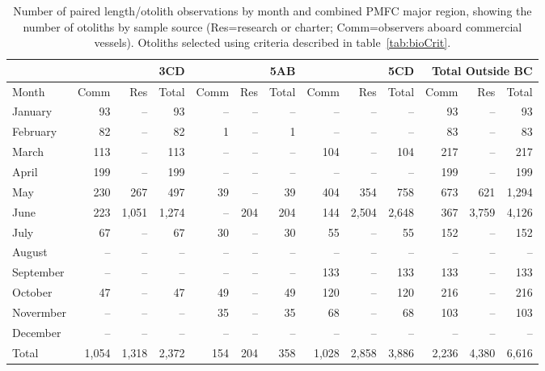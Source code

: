 \begin{table}[b]
\tiny
\centering
\caption{\label{tab:numagesByAreaMonth} Number of paired length/otolith observations by month and combined PMFC major region, showing the number of otoliths by sample source (Res=research or charter; Comm=observers aboard commercial vessels). Otoliths selected using criteria described in table~\ref{tab:bioCrit}.}
\begin{tabular}{|l|rrr|rrr|rrr|rrr|}
\hline
      & \multicolumn{3}{r|}{3CD} & \multicolumn{3}{r|}{5AB} & \multicolumn{3}{r|}{5CD} & \multicolumn{3}{r|}{Total Outside BC} \\
\hline
Month & Comm & Res & Total & Comm & Res & Total & Comm & Res & Total & Comm & Res & Total \\
\hline
January & 93 & -- & 93 & -- & -- & -- & -- & -- & -- & 93 & -- & 93 \\
February & 82 & -- & 82 & 1 & -- & 1 & -- & -- & -- & 83 & -- & 83 \\
March & 113 & -- & 113 & -- & -- & -- & 104 & -- & 104 & 217 & -- & 217 \\
April & 199 & -- & 199 & -- & -- & -- & -- & -- & -- & 199 & -- & 199 \\
May & 230 & 267 & 497 & 39 & -- & 39 & 404 & 354 & 758 & 673 & 621 & 1,294 \\
June & 223 & 1,051 & 1,274 & -- & 204 & 204 & 144 & 2,504 & 2,648 & 367 & 3,759 & 4,126 \\
July & 67 & -- & 67 & 30 & -- & 30 & 55 & -- & 55 & 152 & -- & 152 \\
August & -- & -- & -- & -- & -- & -- & -- & -- & -- & -- & -- & -- \\
September & -- & -- & -- & -- & -- & -- & 133 & -- & 133 & 133 & -- & 133 \\
October & 47 & -- & 47 & 49 & -- & 49 & 120 & -- & 120 & 216 & -- & 216 \\
Novermber & -- & -- & -- & 35 & -- & 35 & 68 & -- & 68 & 103 & -- & 103 \\
December & -- & -- & -- & -- & -- & -- & -- & -- & -- & -- & -- & -- \\
Total & 1,054 & 1,318 & 2,372 & 154 & 204 & 358 & 1,028 & 2,858 & 3,886 & 2,236 & 4,380 & 6,616 \\
\hline
\end{tabular}
\end{table}

